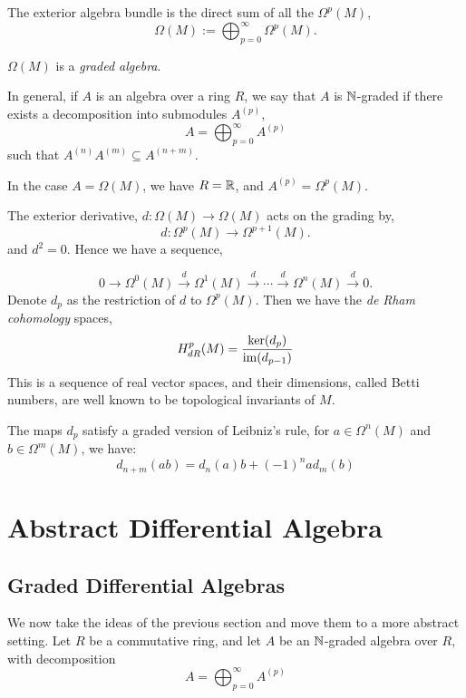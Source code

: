 The exterior algebra bundle is the direct sum of all the $\Omega^p(M)$,
\begin{equation*}
    \Omega(M) := \bigoplus_{p=0}^\infty \Omega^p(M).
\end{equation*}


$\Omega(M)$ is a \emph{graded algebra}.


In general, if $A$ is an algebra over a ring $R$, we say that $A$ is $\mathbb{N}$-graded
if there exists a decomposition into submodules $A^{(p)}$,
\begin{equation*}
    A = \bigoplus_{p=0}^\infty A^{(p)}
\end{equation*}
such that $A^{(n)}A^{(m)} \subseteq A^{(n+m)}$.

In the case $A = \Omega(M)$, we have $R = \mathbb{R}$, and $A^{(p)} = \Omega^p(M)$.

The exterior derivative, $d:\Omega(M)\rightarrow \Omega(M)$ acts on the grading by,
\begin{equation*}
    d:\Omega^p(M) \rightarrow \Omega^{p+1}(M).
\end{equation*}
and $d^2 = 0$. Hence we have a sequence,

\begin{equation*}
    0\rightarrow \Omega^{0}(M) \xrightarrow{d} \Omega^1(M) \xrightarrow{d} \cdots \xrightarrow{d} \Omega^n(M) \xrightarrow{d} 0.
\end{equation*}
Denote $d_p$ as the restriction of $d$ to $\Omega^p(M)$. Then we have the \emph{de Rham cohomology}
spaces,
\begin{equation*}
    H^p_{dR}(M) = \frac{\ker(d_{p})}{\operatorname{im}(d_{p-1})}
\end{equation*}
This is a sequence of real vector spaces, and their dimensions, called
Betti numbers, are well known to be topological
invariants of $M$.

The maps $d_p$ satisfy a graded version of Leibniz's rule, for $a \in \Omega^n(M)$
and $b \in \Omega^m(M)$, we have:
\begin{equation*}
    d_{n+m}(ab) = d_n(a)b+(-1)^nad_m(b)
\end{equation*}

\section{Abstract Differential Algebra}
\subsection{Graded Differential Algebras}
We now take the ideas of the previous section and move them to a more abstract setting.
Let $R$ be a commutative ring, and let $A$ be an $\mathbb{N}$-graded algebra over $R$, with decomposition
\begin{equation*}
    A = \bigoplus_{p=0}^\infty A^{(p)}
\end{equation*}

